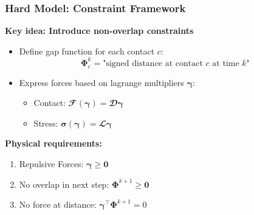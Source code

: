 \documentclass[10pt,t]{beamer}
\begin{document}
\begin{frame}
    \frametitle{Hard Model: Constraint Framework}

    \textbf{Key idea: Introduce non-overlap constraints}
    \begin{itemize}
        \item Define gap function for each contact $c$:
              \begin{equation*}
                  \boldsymbol{\Phi}^k_c = \text{"signed distance at contact } c \text{ at time } k  \text{"}
              \end{equation*}

        \item Express forces based on lagrange multipliers $\boldsymbol{\gamma}$:
              \begin{itemize}
                  \item Contact: $\mathbfcal{F}(\boldsymbol{\gamma}) = \mathbfcal{D} \boldsymbol{\gamma}$
                  \item Stress: $\boldsymbol{\sigma}(\boldsymbol{\gamma}) = \mathbfcal{L} \boldsymbol{\gamma}$
              \end{itemize}
    \end{itemize}

    \vspace{0.3cm}

    \textbf{Physical requirements:}
    \begin{enumerate}
        \item {Repulsive Forces:} \hspace{2.42cm}  $\boldsymbol{\gamma} \geq \mathbf{0}$
        \item {No overlap in next step:} \hspace{1cm} $\boldsymbol{\Phi}^{k+1} \geq \mathbf{0}$
        \item {No force at distance:} \hspace{1cm} $\boldsymbol{\gamma}^\top \boldsymbol{\Phi}^{k+1} = 0$
    \end{enumerate}

\end{frame}
\end{document}
